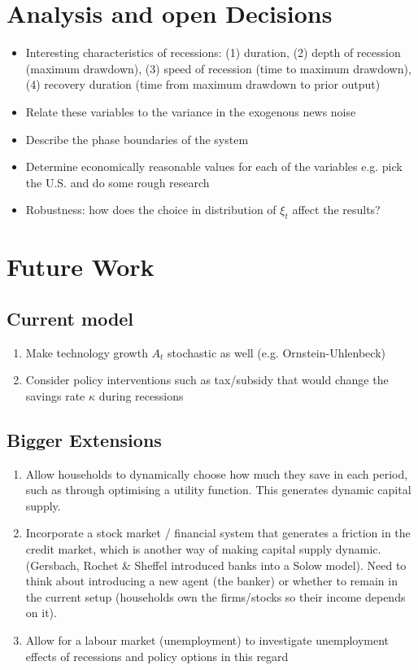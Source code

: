 \documentclass[11pt]{article}
\begin{document}
\section{Analysis and open Decisions}
\begin{itemize}
\item Interesting characteristics of recessions: (1) duration, (2) depth of recession (maximum drawdown), (3) speed of recession (time to maximum drawdown), (4) recovery duration (time from maximum drawdown to prior output)
\item Relate these variables to the variance in the exogenous news noise
\item Describe the phase boundaries of the system
\item Determine economically reasonable values for each of the variables e.g. pick the U.S. and do some rough research
\item Robustness: how does the choice in distribution of $\xi_t$ affect the results?
\end{itemize}

\section{Future Work}
\subsection{Current model}
\begin{enumerate}
\item Make technology growth $A_t$ stochastic as well (e.g. Ornstein-Uhlenbeck)
\item Consider policy interventions such as tax/subsidy that would change the savings rate $\kappa$ during recessions
\end{enumerate}

\subsection{Bigger Extensions}
\begin{enumerate}
\item Allow households to dynamically choose how much they save in each period, such as through optimising a utility function. This generates dynamic capital supply.\item Incorporate a stock market / financial system that generates a friction in the credit market, which is another way of making capital supply dynamic. (Gersbach, Rochet \& Sheffel introduced banks into a Solow model). Need to think about introducing a new agent (the banker) or whether to remain in the current setup (households own the firms/stocks so their income depends on it).
\item Allow for a labour market (unemployment) to investigate unemployment effects of recessions and policy options in this regard
\end{enumerate}
\end{document}
